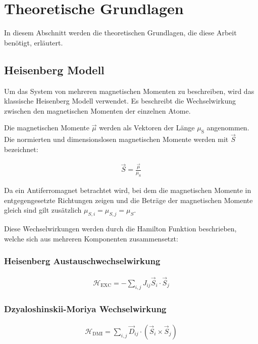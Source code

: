 \documentclass[main.tex]{subfiles}
\begin{document}
\section{Theoretische Grundlagen}

In diesem Abschnitt werden die theoretischen Grundlagen, die diese Arbeit
benötigt, erläutert.

\subsection{Heisenberg Modell}

Um das System von mehreren magnetischen Momenten zu beschreiben, wird das
klassische Heisenberg Modell verwendet. Es beschreibt die Wechselwirkung
zwischen den magnetischen Momenten der einzelnen Atome.

Die magnetischen Momente \(\vec{\mu}\) werden als Vektoren der Länge
\(\mu_{\text{S}}\) angenommen.
Die normierten und dimensionslosen magnetischen Momente werden mit \(\vec{S}\)
bezeichnet:

\begin{align}
	\vec{S} = \frac{\vec{\mu}}{\mu_{\text{S}}}
\end{align}

Da ein Antiferromagnet betrachtet wird, bei dem die magnetischen Momente in
entgegengesetzte Richtungen zeigen und die Beträge der magnetischen Momente
gleich sind gilt zusätzlich \(\mu_{S,i} = \mu_{S,j} = \mu_{S}\).

Diese Wechselwirkungen werden durch die Hamilton Funktion beschrieben, welche
sich aus mehreren Komponenten zusammensetzt:

\subsubsection*{Heisenberg Austauschwechselwirkung}

\begin{align}
	\mathcal{H}_{\text{EXC}} = -\sum_{i,j} J_{ij} \vec{S}_i \cdot \vec{S}_j
\end{align}

\subsubsection*{Dzyaloshinskii-Moriya Wechselwirkung}

\begin{align}
	\mathcal{H}_{\text{DMI}} = \sum_{i,j} \vec{D}_{ij} \cdot (\vec{S}_i \times
	\vec{S}_j)
\end{align}
\end{document}
